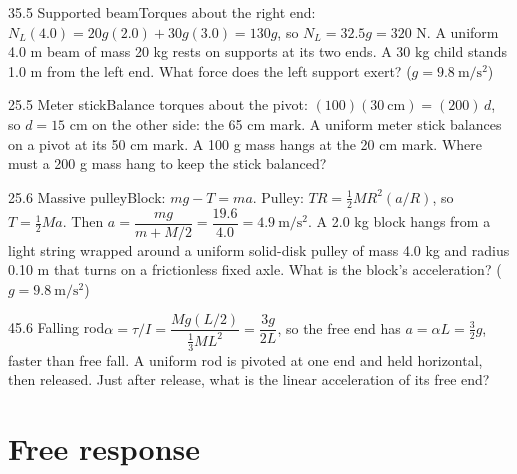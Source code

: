 \documentclass[11pt]{article}
\begin{document}
\begin{q}{3}{5.5 Supported beam}{Torques about the right end: $N_L(4.0) = 20g(2.0) + 30g(3.0) = 130g$, so $N_L = 32.5g = 320$ N.}
A uniform 4.0 m beam of mass 20 kg rests on supports at its two ends. A 30 kg child stands 1.0 m from the left end. What force does the left support exert? ($g = 9.8\ \mathrm{m/s^2}$)
\end{q}
\begin{q}{2}{5.5 Meter stick}{Balance torques about the pivot: $(100)(30\ \mathrm{cm}) = (200)\,d$, so $d = 15$ cm on the other side: the 65 cm mark.}
A uniform meter stick balances on a pivot at its 50 cm mark. A 100 g mass hangs at the 20 cm mark. Where must a 200 g mass hang to keep the stick balanced?
\end{q}
\begin{q}{2}{5.6 Massive pulley}{Block: $mg - T = ma$. Pulley: $TR = \tfrac12 MR^2(a/R)$, so $T = \tfrac12 Ma$. Then $a = \dfrac{mg}{m + M/2} = \dfrac{19.6}{4.0} = 4.9\ \mathrm{m/s^2}$.}
A 2.0 kg block hangs from a light string wrapped around a uniform solid-disk pulley of mass 4.0 kg and radius 0.10 m that turns on a frictionless fixed axle. What is the block's acceleration? ($g = 9.8\ \mathrm{m/s^2}$)
\end{q}
\begin{q}{4}{5.6 Falling rod}{$\alpha = \tau/I = \dfrac{Mg(L/2)}{\tfrac13 ML^2} = \dfrac{3g}{2L}$, so the free end has $a = \alpha L = \tfrac32 g$, faster than free fall.}
A uniform rod is pivoted at one end and held horizontal, then released. Just after release, what is the linear acceleration of its free end?
\end{q}

\section{Free response}
\end{document}
